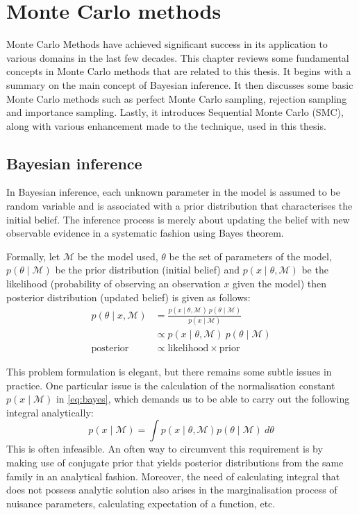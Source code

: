 \chapter{Monte Carlo methods}
\graphicspath{{Chapter2/figures/}}
\label{cha:mcmethods}
Monte Carlo Methods have achieved significant success in its application to various domains in the last few decades. This chapter reviews some fundamental concepts in Monte Carlo methods that are related to this thesis. It begins with a summary on the main concept of Bayesian inference. It then discusses some basic Monte Carlo methods such as perfect Monte Carlo sampling, rejection sampling and importance sampling. Lastly, it introduces Sequential Monte Carlo (SMC), along with various enhancement made to the technique, used in this thesis.

\section{Bayesian inference}
In Bayesian inference, each unknown parameter in the model is assumed to be random variable and is associated with a prior distribution that characterises the initial belief. The inference process is merely about updating the belief with new observable evidence in a systematic fashion using Bayes theorem.

Formally, let $\mathcal{M}$ be the model used, $\theta$ be the set of parameters of the model, $p\left(\theta \mid \mathcal{M}\right)$ be the prior distribution (initial belief) and $p(x \mid \theta, \mathcal{M})$ be the likelihood (probability of observing an observation $x$ given the model) then posterior distribution (updated belief) is given as follows:  
\begin{align}
  p(\theta \mid x , \mathcal{M}) &= \frac{p(x \mid \theta , \mathcal{M})~p(\theta \mid \mathcal{M})}{p(x \mid \mathcal{M})} \nonumber \\
                   &\propto p(x \mid \theta , \mathcal{M})~p(\theta \mid \mathcal{M}) \label{eq:bayes} \\
  \text{posterior} &\propto \text{likelihood} \times \text{prior}
\end{align}

This problem formulation is elegant, but there remains some subtle issues in practice. One particular issue is the calculation of the normalisation constant $p(x \mid \mathcal{M})$ in \eqref{eq:bayes}, which demands us to be able to carry out the following integral  analytically:
\begin{equation}
  p(x \mid \mathcal{M}) = \int p(x \mid \theta, \mathcal{M}) p(\theta \mid \mathcal{M})~d\theta
\end{equation}
This is often infeasible. An often way to circumvent this requirement is by making use of conjugate prior that yields posterior distributions from the same family in an analytical fashion. Moreover, the need of calculating integral that does not possess analytic solution also arises in the marginalisation process of nuisance parameters, calculating expectation of a function, etc.

